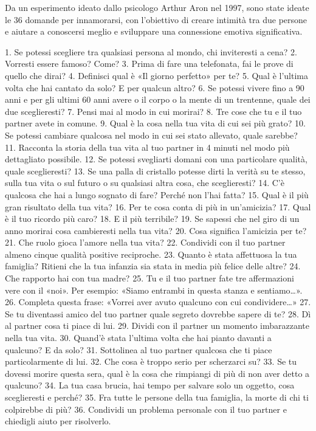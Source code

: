 \documentclass[12pt]{book} %
\begin{document}
Da un esperimento ideato dallo psicologo Arthur Aron nel 1997, sono state ideate le 36 domande per innamorarsi, con l'obiettivo di creare intimità tra due persone e aiutare a conoscersi meglio e sviluppare una connessione emotiva significativa. 

1. Se potessi scegliere tra qualsiasi persona al mondo, chi inviteresti a cena?
2. Vorresti essere famoso? Come?
3. Prima di fare una telefonata, fai le prove di quello che dirai?
4. Definisci qual è «Il giorno perfetto» per te?
5. Qual è l’ultima volta che hai cantato da solo? E per qualcun altro?
6. Se potessi vivere fino a 90 anni e per gli ultimi 60 anni avere o il corpo o la mente di un trentenne, quale dei due sceglieresti?
7. Pensi mai al modo in cui morirai?
8. Tre cose che tu e il tuo partner avete in comune.
9. Qual è la cosa nella tua vita di cui sei più grato?
10. Se potessi cambiare qualcosa nel modo in cui sei stato allevato, quale sarebbe?
11. Racconta la storia della tua vita al tuo partner in 4 minuti nel modo più dettagliato possibile.
12. Se potessi svegliarti domani con una particolare qualità, quale sceglieresti?
13. Se una palla di cristallo potesse dirti la verità su te stesso, sulla tua vita o sul futuro o su qualsiasi altra cosa, che sceglieresti?
14. C’è qualcosa che hai a lungo sognato di fare? Perché non l’hai fatta?
15. Qual è il più gran risultato della tua vita?
16. Per te cosa conta di più in un’amicizia?
17. Qual è il tuo ricordo più caro?
18. E il più terribile?
19. Se sapessi che nel giro di un anno morirai cosa cambieresti nella tua vita?
20. Cosa significa l’amicizia per te?
21. Che ruolo gioca l’amore nella tua vita?
22. Condividi con il tuo partner almeno cinque qualità positive reciproche.
23. Quanto è stata affettuosa la tua famiglia? Ritieni che la tua infanzia sia stata in media più felice delle altre?
24. Che rapporto hai con tua madre?
25. Tu e il tuo partner fate tre affermazioni vere con il «noi». Per esempio: «Siamo entrambi in questa stanza e sentiamo…».
26. Completa questa frase: «Vorrei aver avuto qualcuno con cui condividere…»
27. Se tu diventassi amico del tuo partner quale segreto dovrebbe sapere di te?
28. Dì al partner cosa ti piace di lui.
29. Dividi con il partner un momento imbarazzante nella tua vita.
30. Quand’è stata l’ultima volta che hai pianto davanti a qualcuno? E da solo?
31. Sottolinea al tuo partner qualcosa che ti piace particolarmente di lui.
32. Che cosa è troppo serio per scherzarci su?
33. Se tu dovessi morire questa sera, qual è la cosa che rimpiangi di più di non aver detto a qualcuno?
34. La tua casa brucia, hai tempo per salvare solo un oggetto, cosa sceglieresti e perché?
35. Fra tutte le persone della tua famiglia, la morte di chi ti colpirebbe di più?
36. Condividi un problema personale con il tuo partner e chiedigli aiuto per risolverlo.
\end{document}
